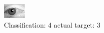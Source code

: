 \begin{figure}[h!]
\begin{center}
\includegraphics[width=0.60\columnwidth]{figures/ID2854_class_4_target_3.png}
\end{center}
\caption{ Classification: 4 actual target: 3}
\label{fig:ID2854_class_4_target_3}
\end{figure}
